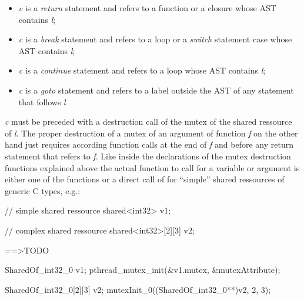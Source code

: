 \begin{itemize}
\item \textit{c} is a \textit{return} statement and refers to a function or a closure whose AST contains \textit{l};
\item \textit{c} is a \textit{break} statement and refers to a loop or a \textit{switch} statement case whose AST contains \textit{l};
\item \textit{c} is a \textit{continue} statement and refers to a loop whose AST contains \textit{l};
\item \textit{c} is a \textit{goto} statement and refers to a label outside the AST of any statement that follows \textit{l}
\end{itemize}
\textit{c} must be preceded with a destruction call of the mutex of the shared ressource of \textit{l}.  The proper destruction of a mutex of an argument of function \textit{f} on the other hand just requires according function calls at the end of \textit{f} and before any return statement that refers to \textit{f}. 
Like inside the declarations of the mutex destruction functions explained above  the actual function to call for a variable or argument is either one of the  functions or a direct call of  for ``simple'' shared ressources of generic C types, e.g.:
\begin{center}
\begin{minipage}{0.3\textwidth}
\begin{ccode}
// simple shared ressource
shared<int32> v1;

// complex shared ressource
shared<int32>[2][3] v2;
\end{ccode}
\end{minipage}
\qquad==>TODO\qquad\qquad
\begin{minipage}{0.4\textwidth}
\begin{ccode}
SharedOf_int32_0 v1;
pthread_mutex_init(&v1.mutex, &mutexAttribute);

SharedOf_int32_0[2][3] v2;
mutexInit_0((SharedOf_int32_0**)v2, 2, 3);
\end{ccode}
\end{minipage}
\end{center}

